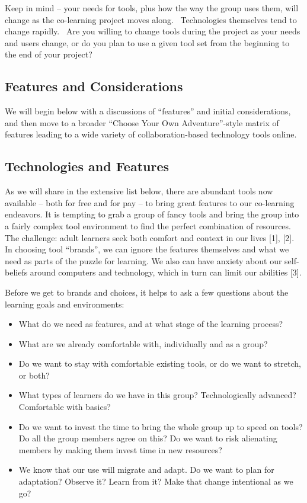 Keep in mind -- your needs for tools, plus how the way the group uses
them, will change as the co-learning project moves along.~ Technologies
themselves tend to change rapidly.~ Are you willing to change tools
during the project as your needs and users change, or do you plan to use
a given tool set from the beginning to the end of your project?

\hypertarget{features-and-considerations}{%
\subsection{Features and
Considerations}\label{features-and-considerations}}

We will begin below with a discussions of ``features'' and initial
considerations, and then move to a broader ``Choose Your Own
Adventure''-style matrix of features leading to a wide variety of
collaboration-based technology tools online.

\hypertarget{technologies-and-features}{%
\subsection{Technologies and
Features}\label{technologies-and-features}}

As we will share in the extensive list below, there are abundant tools
now available -- both for free and for pay -- to bring great features to
our co-learning endeavors. It is tempting to grab a group of fancy tools
and bring the group into a fairly complex tool environment to find the
perfect combination of resources. The challenge: adult learners seek
both comfort and context in our lives {{[}1{]}}, {{[}2{]}}. In choosing
tool ``brands'', we can ignore the features themselves and what we need
as parts of the puzzle for learning. We also can have anxiety about our
self-beliefs around computers and technology, which in turn can limit
our abilities {{[}3{]}}.

Before we get to brands and choices, it helps to ask a few questions
about the learning goals and environments:

\begin{itemize}
\tightlist
\item
  What do we need as features, and at what stage of the learning
  process?
\item
  What are we already comfortable with, individually and as a group?
\item
  Do we want to stay with comfortable existing tools, or do we want to
  stretch, or both?
\item
  What types of learners do we have in this group? Technologically
  advanced? Comfortable with basics?
\item
  Do we want to invest the time to bring the whole group up to speed on
  tools? Do all the group members agree on this? Do we want to risk
  alienating members by making them invest time in new resources?
\item
  We know that our use will migrate and adapt. Do we want to plan for
  adaptation? Observe it? Learn from it? Make that change intentional as
  we go?
\end{itemize}


